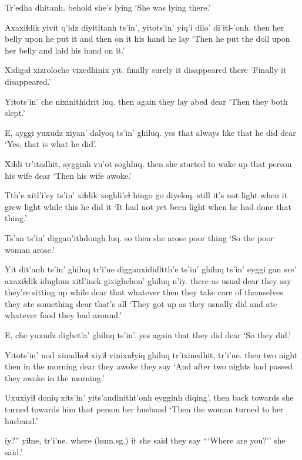 \documentclass[12pt]{article}
\begin{document}
\gll Tr'edha dhitanh.
behold {she's lying}
\glt `She was lying there.'
\glend

\gll Axaxiɬdik yivit  q'idz diyitltanh ts'in', yitots'in' yiq'i dilo'  di'itl-'onh.
then {her belly} upon {he put it} and then {on it} {his hand} {he lay}
\glt `Then he put the doll upon her belly and laid his hand on it.'
\glend

\gll Xidigaɬ xizroloche vixedhinix yit.
finally  surely  {it disappeared} there
\glt `Finally it disappeared.'
\glend

\gll Yitots'in' che nixinithidrit luq.
then  again {they lay abed} dear
\glt `Then they both slept.'
\glend

\gll E, ayggi {yuxudz xiyan'} dalyoq ts'in' ghiluq.
yes that {always like that} {he did} {} dear
\glt `Yes, that is what he did'.
\glend

\gll Xiɬdi tr'itadhit, aygginh vu'ot soghluq.
then {she started to wake up} {that person} {his wife} dear
\glt `Then his wife awoke.'
\glend

\gll Tth'e  {xitl'i'ey ts'in'}  xiɬdik xoghli'eɬ hingo go diyeloq.
{still} {it's not light} when {it grew light} while this {he did it}
\glt `It had not yet been light when he had done that thing.'
\glend

\gll Ts'an ts'in' diggan'ithdongh luq.
so then {she arose} {poor thing}
\glt `So the poor woman arose.'
\glend

\gll Yit {dit'anh ts'in'} ghiluq tr'i'ne digganxididltth'e ts'in' ghiluq ts'in' eyggi {gan sre'} axaxiɬdik {idughun xitl'inek} gixighehon' ghiluq n'iy.
there {as usual} {dear} {they say} {they're sitting up} while dear {} that whatever then  {they take care of themselves} {they ate something} dear {that's all}
\glt `They got up as they usually did and ate whatever food they had around.'
\glend

\gll E, che yuxudz  dighet'a' ghiluq ts'in'.
yes again that {they did} dear
\glt `So they did.'
\glend

\gll Yitots'in' nod xinadhoɬ xiyiɬ vinixuɬyiq ghiluq tr'ixinedhit, tr'i'ne.
then  two night then {in the morning} dear {they awoke} {they say}
\glt `And after two nights had passed they awoke in the morning.'
\glend

\gll Uxuxiyiɬ doniq xits'in' yits'andinitht'onh  eygginh diqing'.
then  back  towards {she turned towards him}  {that person}  {her husband}
\glt `Then the woman turned to her husband.'
\glend

 iy?'' yiɬne,  tr'i'ne.
{where (hum.sg.)} it  {she said} {they say}
\glt ```Where are you?'' she said.'
\glend
\end{document}
